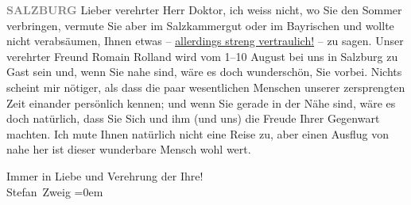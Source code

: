 \pstart
           \raggedleft{}\textcolor{gray}{\textbf{SALZBURG}}\pend
           \vspace{0.5em}
\pstart
           Lieber verehrter Herr Doktor, ich weiss nicht, wo Sie den Sommer
               verbringen, vermute Sie aber im Salzkammergut
               oder im Bayrischen und wollte nicht verabsäumen,
               Ihnen etwas – \uline{allerdings streng vertraulich!} – zu
               sagen. Unser verehrter Freund Romain Rolland
               wird vom 1–10 August bei uns in Salzburg zu Gast sein und, wenn Sie nahe sind, wäre es doch
               wunderschön, Sie \label{K_L03667-1v}\label{K_L03667-1} vorbei. Nichts scheint mir nötiger, als dass die
               paar wesentlichen Menschen unserer zersprengten Zeit einander persönlich kennen; und
               wenn Sie gerade in der Nähe sind, wäre es doch natürlich, dass Sie Sich und ihm (und
               uns) die Freude Ihrer Gegenwart machten. Ich mute Ihnen natürlich nicht eine Reise
               zu, aber einen Ausflug von nahe her ist dieser wunderbare Mensch wohl wert.\pend
           
\pstart
           Immer in Liebe und Verehrung der Ihre!{\\[\baselineskip]}\spacefill\mbox{Stefan Zweig}\pend
           \leftskip=0em{}\endnumbering{}  \newcommand{\dateiname}{L03667}\newcommand{\titel}{Stefan Zweig an Arthur Schnitzler, 23. 7. 1923}\newcommand{\editorInnen}{Selma Jahnke und Martin Anton Müller}
